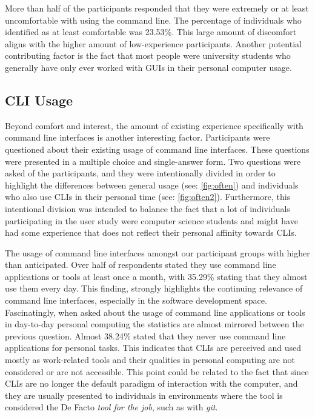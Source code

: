 More than half of the participants responded that they were extremely or at
least uncomfortable with using the command line. The percentage of individuals
who identified as at least comfortable was 23.53\%. This large amount of
discomfort aligns with the higher amount of low-experience participants.
Another potential contributing factor is the fact that most people were
university students who generally have only ever worked with GUIs in their
personal computer usage.

\FloatBarrier %

\subsection{CLI Usage}

Beyond comfort and interest, the amount of existing experience specifically with
command line interfaces is another interesting factor. Participants were
questioned about their existing usage of command line interfaces. These
questions were presented in a multiple choice and single-answer form. Two
questions were asked of the participants, and they were intentionally divided
in order to highlight the differences between general usage  (see:
\autoref{fig:often}) and individuals who also use CLIs in their personal time
(see: \autoref{fig:often2}). Furthermore, this intentional division was
intended to balance the fact that a lot of individuals participating in the
user study were computer science students and might have had some experience
that does not reflect their personal affinity towards CLIs.

The usage of command line interfaces amongst our participant groups with higher
than anticipated. Over half of respondents stated they use command line
applications or tools at least once a month, with 35.29\% stating that they
almost use them every day. This finding, strongly highlights the continuing
relevance of command line interfaces, especially in the software development
space. Fascinatingly, when asked about the usage of command line applications or
tools in day-to-day personal computing the statistics are almost mirrored
between the previous question. Almost 38.24\% stated that they never use
command line applications for personal tasks. This indicates that CLIs are
perceived and used mostly as work-related tools and their qualities in
personal computing are not considered or are not accessible. This point could
be related to the fact that since CLIs are no longer the default paradigm of
interaction with the computer, and they are usually presented to individuals in
environments where the tool is considered the De Facto \textit{tool  for the job},
such as with \textit{git}\cite{hultstrand2015git}.

